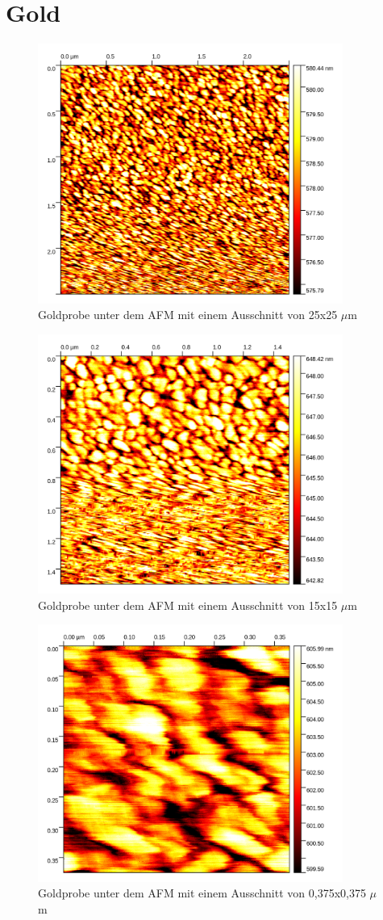 \clearpage
\section{Gold}

\begin{figure}[h]
    \centering
    \includegraphics[width = 10cm]{Bilder/Gold/Gold25um.png}
    \caption{Goldprobe unter dem AFM mit einem Ausschnitt von 25x25 $\mu$m}
    \label{Gold1}
\end{figure}


\begin{figure}[h]
    \centering
    \includegraphics[width = 10cm]{Bilder/Gold/Gold15um.png}
    \caption{Goldprobe unter dem AFM mit einem Ausschnitt von 15x15 $\mu$m}
    \label{Gold2}
\end{figure}



\begin{figure}[h]
    \centering
    \includegraphics[width = 10cm]{Bilder/Gold/Gold0375um.png}
    \caption{Goldprobe unter dem AFM mit einem Ausschnitt von 0,375x0,375 $\mu$m}
    \label{Gold3}
\end{figure}
